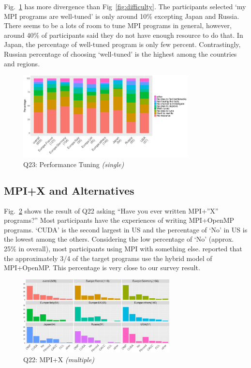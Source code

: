 \documentclass[conference,10pt,letterpaper]{IEEEtran}
\def\myquote#1{`#1'}
\begin{document}
Fig.~\ref{fig:tuning} has more divergence than
Fig~\ref{fig:difficulty}. The participants selected \myquote{my MPI
  programs are well-tuned} is only around 10\% excepting Japan and
Russia. There seems to be a lots of room to tune MPI programs in
general, however, around 40\% of participants said they do not have
enough resource to do that. In Japan, the percentage of well-tuned
program is only few percent. Contrastingly, Russian percentage of
choosing \myquote{well-tuned} is the highest among the countries and
regions. 

\begin{figure}[htb]
\begin{center}
\includegraphics[width=9cm]{R-scripts/Q23.pdf}
\caption{Q23: Performance Tuning {\it(single)}}
\label{fig:tuning}
\end{center}
\end{figure}

\subsection{MPI+X and Alternatives}

Fig.~\ref{fig:mpi-x} shows the result of Q22 asking ``Have you ever
written MPI+''X'' programs?'' Most participants have the experiences of
writing MPI+OpenMP programs. \myquote{CUDA} is the second largest in
US and the percentage of \myquote{No} in US is the lowest among the
others. Considering the low percentage of \myquote{No} (approx.
25\% in overall), most participants using MPI with something else.
\cite{10.1145/3295500.3356176} reported that the approximately 3/4 of
the target programs use the hybrid model of MPI+OpenMP. This percentage
is very close to our survey result.

\begin{figure}[htb]
\begin{center}
\includegraphics[width=8cm]{R-scripts/Q22.pdf}
\caption{Q22: MPI+X {\it(multiple)}}
\label{fig:mpi-x}
\end{center}
\end{figure}
\end{document}
